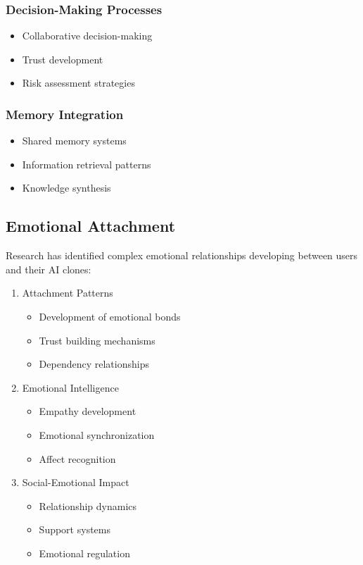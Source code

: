 \subsubsection{Decision-Making Processes}
\begin{itemize}
\item Collaborative decision-making
\item Trust development
\item Risk assessment strategies
\end{itemize}

\subsubsection{Memory Integration}
\begin{itemize}
\item Shared memory systems
\item Information retrieval patterns
\item Knowledge synthesis
\end{itemize}

\subsection{Emotional Attachment}

Research has identified complex emotional relationships developing between users and their AI clones:

\begin{enumerate}
\item Attachment Patterns
\begin{itemize}
\item Development of emotional bonds
\item Trust building mechanisms
\item Dependency relationships
\end{itemize}

\item Emotional Intelligence
\begin{itemize}
\item Empathy development
\item Emotional synchronization
\item Affect recognition
\end{itemize}

\item Social-Emotional Impact
\begin{itemize}
\item Relationship dynamics
\item Support systems
\item Emotional regulation
\end{itemize}
\end{enumerate}

